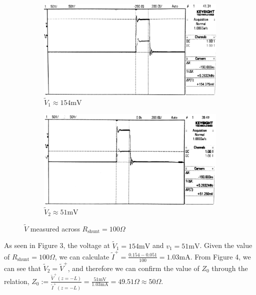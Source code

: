 \documentclass[10pt]{article}
\begin{document}
\begin{figure}[ht]
    \centering
    \begin{subfigure}[b]{0.45\textwidth}
        \includegraphics[width=\textwidth]{../photos/lab1/shunt_delta_v_1.jpg}
        \caption{$\tilde V_1 \approx 154\text{mV}$}
    \end{subfigure}
    \quad
    \begin{subfigure}[b]{0.45\textwidth}
        \includegraphics[width=\textwidth]{../photos/lab1/shunt_delta_v_2.jpg}
        \caption{$\tilde V_2 \approx 51\text{mV}$}
    \end{subfigure}
    \caption{$\tilde V$ measured across $R_\text{shunt} = 100\Omega$\vspace{-0.5cm}}
    \label{delta_v_shunt}
\end{figure}

As seen in Figure 3, the voltage at $\tilde V_1 = 154\text{mV}$ and $v_1 = 51\text{mV}$. Given the value of $R_\text{shunt} = 100\Omega$,
we can calculate $\tilde I^+ = \frac{0.154-0.051}{100} = 1.03\text{mA}$. From Figure 4, we can see that $\tilde V_2 = \tilde V^+$, and therefore we can confirm the
value of $Z_0$ through the relation, $Z_0 := \frac{\tilde V^+(z=-L)}{\tilde I^+(z=-L)} = \frac{51\text{mV}}{1.03\text{mA}} = 49.51\Omega \approx 50\Omega$.
\end{document}
